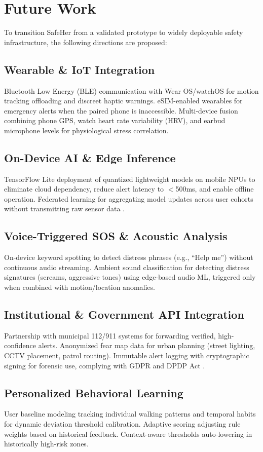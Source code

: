 \section{Future Work}

To transition SafeHer from a validated prototype to widely deployable safety infrastructure, the following directions are proposed:

\subsection{Wearable \& IoT Integration}
Bluetooth Low Energy (BLE) communication with Wear OS/watchOS for motion tracking offloading and discreet haptic warnings. eSIM-enabled wearables for emergency alerts when the paired phone is inaccessible. Multi-device fusion combining phone GPS, watch heart rate variability (HRV), and earbud microphone levels for physiological stress correlation.

\subsection{On-Device AI \& Edge Inference}
TensorFlow Lite deployment of quantized lightweight models on mobile NPUs to eliminate cloud dependency, reduce alert latency to $<$500ms, and enable offline operation. Federated learning for aggregating model updates across user cohorts without transmitting raw sensor data \cite{patel2024}.

\subsection{Voice-Triggered SOS \& Acoustic Analysis}
On-device keyword spotting to detect distress phrases (e.g., ``Help me'') without continuous audio streaming. Ambient sound classification for detecting distress signatures (screams, aggressive tones) using edge-based audio ML, triggered only when combined with motion/location anomalies.

\subsection{Institutional \& Government API Integration}
Partnership with municipal 112/911 systems for forwarding verified, high-confidence alerts. Anonymized fear map data for urban planning (street lighting, CCTV placement, patrol routing). Immutable alert logging with cryptographic signing for forensic use, complying with GDPR and DPDP Act \cite{firebase_functions2024}.

\subsection{Personalized Behavioral Learning}
User baseline modeling tracking individual walking patterns and temporal habits for dynamic deviation threshold calibration. Adaptive scoring adjusting rule weights based on historical feedback. Context-aware thresholds auto-lowering in historically high-risk zones.
